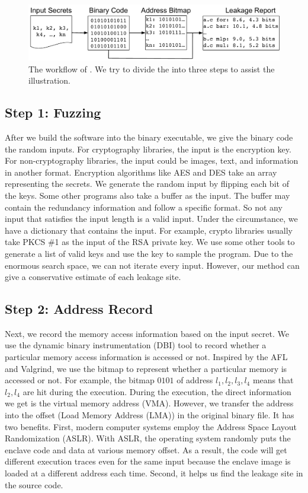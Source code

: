\begin{figure}[ht]
  \centering
  \includegraphics[width=\columnwidth]{./figures/chapter5/workflow.pdf}
  \caption{The workflow of \ctool{}. We try to divide the \ctool{} into three steps to assist the illustration. }\label{chapter5:fig:workflow}
\end{figure}

\subsection{Step 1: Fuzzing}
After we build the software into the binary executable, we give the
binary code the random inputs. For cryptography libraries, the input
is the encryption key. For non-cryptography libraries, the input could
be images, text, and information in another format. Encryption
algorithms like AES and DES take an array representing the secrets. We
generate the random input by flipping each bit of the keys. Some other
programs also take a buffer as the input. The buffer may contain the
redundancy information and follow a specific format. So not any input
that satisfies the input length is a valid input. Under the
circumstance, we have a dictionary that contains the input. For
example, crypto libraries usually take PKCS \#1 as the input of the
RSA private key. We use some other tools to generate a list of valid
keys and use the key to sample the program. Due to the enormous search
space, we can not iterate every input. However, our method can give a
conservative estimate of each leakage site.
\subsection{Step 2: Address Record}
Next, we record the memory access information based on the input
secret. We use the dynamic binary instrumentation (DBI) tool to record
whether a particular memory access information is accessed or
not. Inspired by the AFL and Valgrind, we use the bitmap to represent
whether a particular memory is accessed or not. For example, the
bitmap ${0101}$ of address $l_1, l_2, l_3, l_4$ means that $l_2, l_4$
are hit during the execution. During the execution, the direct
information we get is the virtual memory address (VMA). However, we
transfer the address into the offset (Load Memory Address (LMA)) in
the original binary file. It has two benefits. First, modern computer
systems employ the Address Space Layout Randomization (ASLR). With
ASLR, the operating system randomly puts the enclave code and data at
various memory offset. As a result, the code will get different
execution traces even for the same input because the enclave image is
loaded at a different address each time. Second, it helps us find the
leakage site in the source code.

